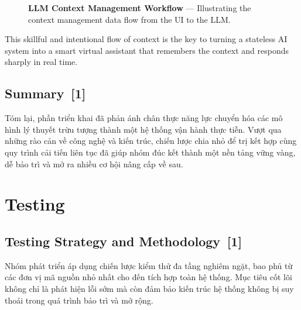 \documentclass[12pt, a4paper]{article}
\begin{document}
\begin{figure}[H]
    \caption{\textbf{LLM Context Management Workflow} --- Illustrating the context management data flow from the UI to the LLM.}
    \label{fig:llm_context_flow}
\end{figure}

This skillful and intentional flow of context is the key to turning a stateless AI system into a smart virtual assistant that remembers the context and responds sharply in real time.

\subsection[Summary]{Summary \,{\normalfont\small\textcolor{cyan!70!black}{[1]}}}
Tóm lại, phần triển khai đã phản ánh chân thực năng lực chuyển hóa các mô hình lý thuyết trừu tượng thành một hệ thống vận hành thực tiễn. Vượt qua những rào cản về công nghệ và kiến trúc, chiến lược chia nhỏ để trị kết hợp cùng quy trình cải tiến liên tục đã giúp nhóm đúc kết thành một nền tảng vững vàng, dễ bảo trì và mở ra nhiều cơ hội nâng cấp về sau.

\section{Testing}

\subsection[Testing Strategy and Methodology]{Testing Strategy and Methodology \,{\normalfont\small\textcolor{cyan!70!black}{[1]}}}
Nhóm phát triển áp dụng chiến lược kiểm thử đa tầng nghiêm ngặt, bao phủ từ các đơn vị mã nguồn nhỏ nhất cho đến tích hợp toàn hệ thống. Mục tiêu cốt lõi không chỉ là phát hiện lỗi sớm mà còn đảm bảo kiến trúc hệ thống không bị suy thoái trong quá trình bảo trì và mở rộng.
\end{document}
